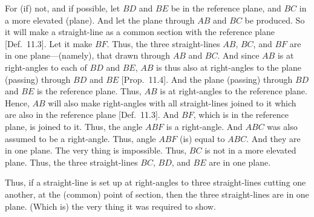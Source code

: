 \begin{Parallel}{}{}
{For (if) not, and if possible, let $BD$ and $BE$ be in the reference plane,
and $BC$ in a more elevated (plane).  And let the plane through $AB$ and
$BC$ be produced. So it will make a straight-line as a
common section with the reference plane [Def.~11.3]. 
Let it make $BF$. Thus, the three straight-lines $AB$, $BC$, and $BF$
are in one plane---(namely), that drawn through $AB$ and $BC$. And since
$AB$ is at right-angles to each of $BD$ and $BE$, $AB$ is thus also at right-angles to the plane (passing) through $BD$ and $BE$ [Prop.~11.4]. And the plane (passing)
through $BD$ and $BE$ is the reference plane. Thus, $AB$ is at
right-angles to the reference plane. Hence, $AB$ will also make right-angles
with all straight-lines joined to it which are also in the reference plane [Def.~11.3].
And $BF$, which is in the reference plane, is joined to  it. Thus, the angle
$ABF$ is a right-angle. And $ABC$ was also assumed to be a right-angle.
Thus, angle $ABF$ (is) equal to $ABC$. And they are in one
plane. The very thing is impossible. Thus, $BC$ is not in a more elevated
plane. Thus, the three straight-lines $BC$, $BD$, and $BE$ are in one plane.

Thus, if a straight-line is set up at right-angles to three straight-lines cutting
one another, at the (common) point of section, then the three straight-lines
are in one plane. (Which is) the very thing it was required to show.}
\end{Parallel}

